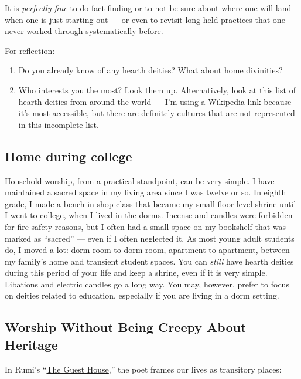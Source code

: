 \documentclass[
]{book}
\providecommand{\tightlist}{%
  \setlength{\itemsep}{0pt}\setlength{\parskip}{0pt}}
\begin{document}
It is \emph{perfectly fine} to do fact-finding or to not be sure about where one will land when one is just starting out --- or even to revisit long-held practices that one never worked through systematically before.

For reflection:

\begin{enumerate}
\def\labelenumi{\arabic{enumi}.}
\tightlist
\item
  Do you already know of any hearth deities? What about home divinities?
\item
  Who interests you the most? Look them up. Alternatively, \href{https://en.wikipedia.org/wiki/Household_deity\#List}{look at this list of hearth deities from around the world} --- I'm using a Wikipedia link because it's most accessible, but there are definitely cultures that are not represented in this incomplete list.
\end{enumerate}

\hypertarget{home-during-college}{%
\subsection{Home during college}\label{home-during-college}}

Household worship, from a practical standpoint, can be very simple. I have maintained a sacred space in my living area since I was twelve or so. In eighth grade, I made a bench in shop class that became my small floor-level shrine until I went to college, when I lived in the dorms. Incense and candles were forbidden for fire safety reasons, but I often had a small space on my bookshelf that was marked as ``sacred'' --- even if I often neglected it. As most young adult students do, I moved a lot: dorm room to dorm room, apartment to apartment, between my family's home and transient student spaces. You can \emph{still} have hearth deities during this period of your life and keep a shrine, even if it is very simple. Libations and electric candles go a long way. You may, however, prefer to focus on deities related to education, especially if you are living in a dorm setting.

\hypertarget{worship-without-being-creepy-about-heritage}{%
\subsection{Worship Without Being Creepy About Heritage}\label{worship-without-being-creepy-about-heritage}}

In Rumi's ``\href{https://www.scottishpoetrylibrary.org.uk/poem/guest-house/}{The Guest House},'' the poet frames our lives as transitory places:
\end{document}
